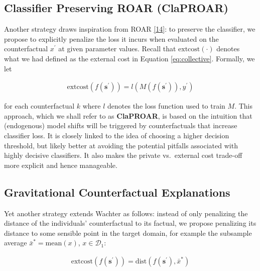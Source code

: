 \documentclass[conference,final,]{IEEEtran}
\theoremstyle{definition}
\theoremstyle{definition}
\theoremstyle{definition}
\theoremstyle{definition}
\theoremstyle{remark}
\begin{document}
\hypertarget{classifier-preserving-roar-claproar}{%
\subsection{Classifier Preserving ROAR (ClaPROAR)}\label{classifier-preserving-roar-claproar}}

Another strategy draws inspiration from ROAR \protect\hyperlink{ref-upadhyay2021robust}{{[}14{]}}: to preserve the classifier, we propose to explicitly penalize the loss it incurs when evaluated on the counterfactual \(x^\prime\) at given parameter values. Recall that \(\text{extcost}(\cdot)\) denotes what we had defined as the external cost in Equation \eqref{eq:collective}. Formally, we let

\begin{equation}
\begin{aligned}
\text{extcost}(f(\mathbf{s}^\prime)) = l(M(f(\mathbf{s}^\prime)),y^\prime) \label{eq:clap}
\end{aligned}
\end{equation}

for each counterfactual \(k\) where \(l\) denotes the loss function used to train \(M\). This approach, which we shall refer to as \textbf{ClaPROAR}, is based on the intuition that (endogenous) model shifts will be triggered by counterfactuals that increase classifier loss. It is closely linked to the idea of choosing a higher decision threshold, but likely better at avoiding the potential pitfalls associated with highly decisive classifiers. It also makes the private vs.~external cost trade-off more explicit and hence manageable.

\hypertarget{gravitational-counterfactual-explanations}{%
\subsection{Gravitational Counterfactual Explanations}\label{gravitational-counterfactual-explanations}}

Yet another strategy extends Wachter as follows: instead of only penalizing the distance of the individuals' counterfactual to its factual, we propose penalizing its distance to some sensible point in the target domain, for example the subsample average \(\bar{x}^*=\text{mean}(x)\), \(x \in \mathcal{D}_1\):

\begin{equation}
\begin{aligned}
\text{extcost}(f(\mathbf{s}^\prime)) = \text{dist}(f(\mathbf{s}^\prime),\bar{x}^*)  \label{eq:grav}
\end{aligned}
\end{equation}
\end{document}
